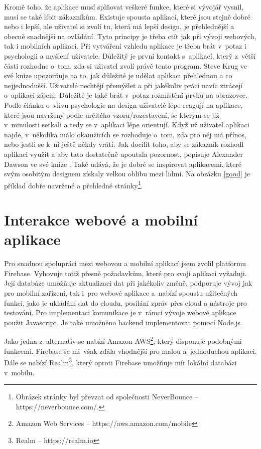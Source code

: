 Kromě toho, že aplikace musí splňovat veškeré funkce, které si vývojář vysnil, musí se také líbit zákazníkům. Existuje spousta aplikací, které jsou stejně dobré nebo i lepší, ale uživatel si zvolí tu, která má lepší design, je přehlednější a obecně snadnější na ovládání. Tyto principy je třeba ctít jak při vývoji webových, tak i mobilních aplikací. Při vytváření vzhledu aplikace je třeba brát v~potaz i psychologii a myšlení uživatele. Důležitý je první kontakt s~aplikací, který z~větší části rozhodne o~tom, zda si uživatel zvolí právě tento program. Steve Krug ve své knize \cite{Krug} upozorňuje na to, jak důležité je udělat aplikaci přehlednou a co nejjednodušší. Uživatelé nechtějí přemýšlet a při jakékoliv práci navíc ztrácejí o~aplikaci zájem. Důležité je také brát v~potaz rozmístění prvků na obrazovce. Podle článku o~vlivu psychologie na design \cite{Than} uživatelé lépe reagují na aplikace, které jsou navrženy podle určitého vzoru/rozestavení, se kterým se již v~minulosti  setkali a tedy se v~aplikaci lépe orientují. Když už uživatel aplikaci najde, v~několika málo okamžicích se rozhoduje o~tom, zda pro něj má přínos, nebo jestli se k~ní ještě někdy vrátí. Jak docílit toho, aby se zákazník rozhodl aplikaci využít a aby tato dostatečně upoutala pozornost, popisuje Alexander Dawson ve své knize \cite{Dawson}. Také udává, že je dobré se inspirovat aplikacemi, které svým osobitým designem získaly velkou oblibu mezi lidmi. Na obrázku \ref{good} je příklad dobře navržené a přehledné stránky\footnote{Obrázek stránky byl převzat od společnosti NeverBounce -- https://neverbounce.com/.}.

\section{Interakce webové a mobilní aplikace}

Pro snadnou spolupráci mezi webovou a mobilní aplikací jsem zvolil platformu Firebase. Vyhovuje totiž přesně požadavkům, které pro svoji aplikaci vyžaduji. Její databáze umožňuje aktualizaci dat při jakékoliv změně, podporuje vývoj jak pro mobilní zařízení, tak i~pro webové aplikace a~nabízí spoustu užitečných funkcí, jako je ukládání dat do cloudu, posílání zpráv přes cloud a nástroje pro testování. Pro implementaci komunikace je v~rámci vývoje webové aplikace použit Javascript. Je také umožněno backend implementovat pomocí Node.js.

Jako jedna z~alternativ se nabízí Amazon AWS\footnote{Amazon Web Services -- https://aws.amazon.com/mobile}, který disponuje podobnými funkcemi. Firebase se mi~však zdála vhodnější pro malou a~jednoduchou aplikaci. Dále se nabízí Realm\footnote{Realm -- https://realm.io}, který oproti Firebase umožňuje mít lokální databázi v~mobilu.

